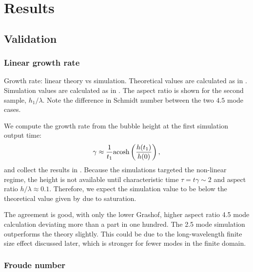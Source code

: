 \section{Results} 

\subsection{Validation}

\subsubsection{Linear growth rate}

\begin{table}

\caption{ 
Growth rate: linear theory vs simulation.
Theoretical values are calculated as in .
Simulation values are calculated as in .
The aspect ratio is shown for the second sample, $h_1 / \lambda$.
Note the difference in Schmidt number between the two $4.5$ mode cases.
}
\end{table}

We compute the growth rate from the bubble height at the first simulation output time:
\begin{equation} \elabel{linear_sim}
\gamma \approx \frac{1}{t_1} \text{acosh}\left(\frac{h(t_1)}{h(0)}\right), 
\end{equation}
and collect the results in .
Because the simulations targeted the non-linear regime, the height is not available until characteristic time $\tau = t \gamma \sim 2$ and aspect ratio $h / \lambda \approx 0.1$.
Therefore, we expect the simulation value to be below the theoretical value given by  due to saturation.

The agreement is good, with only the lower Grashof, higher aspect ratio 4.5 mode calculation deviating more than a part in one hundred.
The 2.5 mode simulation outperforms the theory slightly.
This could be due to the long-wavelength finite size effect discussed later, which is stronger for fewer modes in the finite domain.

\subsubsection{Froude number}

